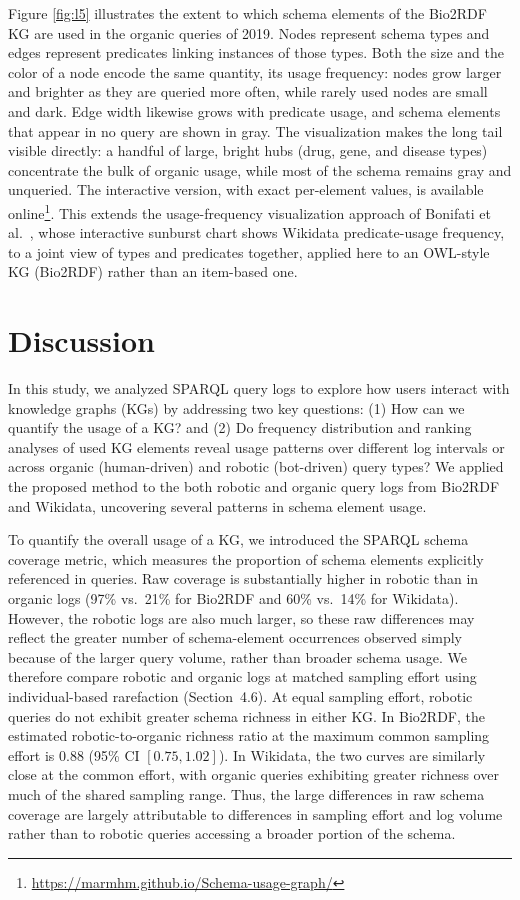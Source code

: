 \documentclass[sw]{iosart2x}
\begin{document}
Figure \ref{fig:l5} illustrates the extent to which schema elements of the Bio2RDF KG are used in the organic queries of 2019. Nodes represent schema types and edges represent predicates linking instances of those types. Both the size and the color of a node encode the same quantity, its usage frequency: nodes grow larger and brighter as they are queried more often, while rarely used nodes are small and dark. Edge width likewise grows with predicate usage, and schema elements that appear in no query are shown in gray. The visualization makes the long tail visible directly: a handful of large, bright hubs (drug, gene, and disease types) concentrate the bulk of organic usage, while most of the schema remains gray and unqueried. The interactive version, with exact per-element values, is available online\footnote{\url{https://marmhm.github.io/Schema-usage-graph/}}. This extends the usage-frequency visualization approach of Bonifati et al.~\cite{bonifati2019navigating}, whose interactive sunburst chart shows Wikidata predicate-usage frequency, to a joint view of types and predicates together, applied here to an OWL-style KG (Bio2RDF) rather than an item-based one.


\section{Discussion}\label{s5}
In this study, we analyzed SPARQL query logs to explore how users interact with knowledge graphs (KGs) by addressing two key questions: (1) How can we quantify the usage of a KG? and (2) Do frequency distribution and ranking analyses of used KG elements reveal usage patterns over different log intervals or across organic (human-driven) and robotic (bot-driven) query types? We applied the proposed method to the both robotic and organic query logs from Bio2RDF and Wikidata, uncovering several patterns in schema element usage.

To quantify the overall usage of a KG, we introduced the SPARQL schema coverage metric, which measures the proportion of schema elements explicitly referenced in queries. Raw coverage is substantially higher in robotic than in organic logs (97\% vs.\ 21\% for Bio2RDF and 60\% vs.\ 14\% for Wikidata). However, the robotic logs are also much larger, so these raw differences may reflect the greater number of schema-element occurrences observed simply because of the larger query volume, rather than broader schema usage. We therefore compare robotic and organic logs at matched sampling effort using individual-based rarefaction (Section~4.6). At equal sampling effort, robotic queries do not exhibit greater schema richness in either KG. In Bio2RDF, the estimated robotic-to-organic richness ratio at the maximum common sampling effort is \(0.88\) (95\% CI \([0.75, 1.02]\)). In Wikidata, the two curves are similarly close at the common effort, with organic queries exhibiting greater richness over much of the shared sampling range. Thus, the large differences in raw schema coverage are largely attributable to differences in sampling effort and log volume rather than to robotic queries accessing a broader portion of the schema.
\end{document}

